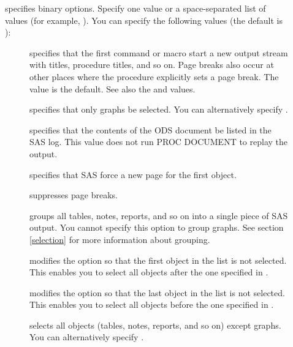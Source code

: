 \documentclass[article,oneside]{memoir}
\begin{document}
\begin{description}
  \item[] specifies binary options.  Specify one value or a space-separated
  list of values (for example, ).
  You can specify the following values (the default is ):
  
  \begin{description}
  \item[] specifies that the first  
  command or  macro start a new output stream with 
  titles, procedure titles, and so on. 
  Page breaks also occur at other places where the procedure 
  explicitly sets a page break. The  value is the default.
  See also the  and  values.
 
 \item[] specifies that only graphs be selected. 
  You can alternatively specify .
    
  \item[] specifies that the contents of the ODS document be listed
  in the SAS log. This value does not run PROC DOCUMENT to replay the output. 

  \item[] specifies that SAS force a new page for the first object. 
  
  \item[] suppresses page breaks. 
  
  \item[] groups all tables, notes, reports, and so on into a
  single piece of SAS output. You cannot specify this option to group graphs.
  See section \ref{selection} for more information about grouping.

  \item[] modifies the  option so that the first object in the 
  list is not selected. This enables you to select all objects after the one 
  specified in .
  
  \item[] modifies the  option so that the last object 
  in the list is not selected. This enables you to select all objects before 
  the one specified in .\label{skiplast}

  \item[] selects all objects 
  (tables, notes, reports, and so on) except graphs. You can 
  alternatively specify .
    

\end{description}
\end{description}
\end{document}
